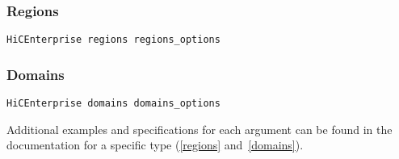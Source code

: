 \subsubsection{Regions}

\begin{lstlisting}
HiCEnterprise regions regions_options
\end{lstlisting}


\subsubsection{Domains}

\begin{lstlisting}
HiCEnterprise domains domains_options
\end{lstlisting}


Additional examples and specifications for each argument can be found in the documentation for a specific type
(\ref{regions} and~\ref{domains}).

